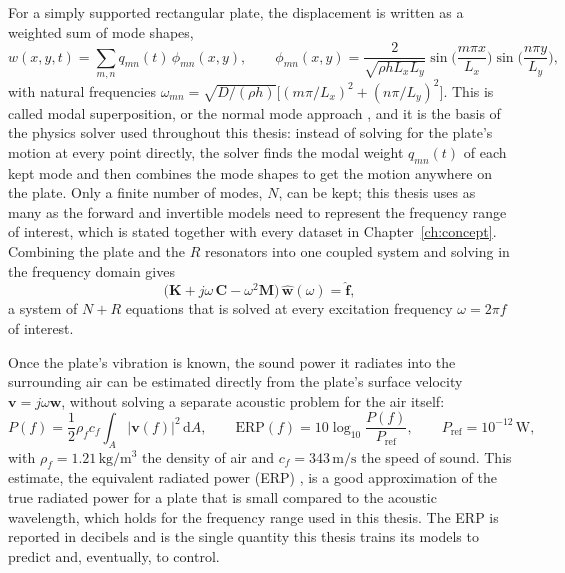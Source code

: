 For a simply supported rectangular plate, the displacement is written as a weighted sum of mode shapes,
\begin{equation}
w(x,y,t) = \sum_{m,n} q_{mn}(t)\,\phi_{mn}(x,y), \qquad \phi_{mn}(x,y) = \frac{2}{\sqrt{\rho h L_x L_y}}\sin\!\Big(\frac{m\pi x}{L_x}\Big)\sin\!\Big(\frac{n\pi y}{L_y}\Big),
\end{equation}
with natural frequencies $\omega_{mn} = \sqrt{D/(\rho h)}\big[(m\pi/L_x)^2 + (n\pi/L_y)^2\big]$. This is called modal superposition, or the normal mode approach \parencite{gavric1993sti}, and it is the basis of the physics solver used throughout this thesis: instead of solving for the plate's motion at every point directly, the solver finds the modal weight $q_{mn}(t)$ of each kept mode and then combines the mode shapes to get the motion anywhere on the plate. Only a finite number of modes, $N$, can be kept; this thesis uses as many as the forward and invertible models need to represent the frequency range of interest, which is stated together with every dataset in Chapter~\ref{ch:concept}. Combining the plate and the $R$ resonators into one coupled system and solving in the frequency domain gives
\begin{equation}
\big(\mathbf K + j\omega\,\mathbf C - \omega^2 \mathbf M\big)\, \hat{\mathbf w}(\omega) = \hat{\mathbf f},
\end{equation}
a system of $N+R$ equations that is solved at every excitation frequency $\omega = 2\pi f$ of interest.

Once the plate's vibration is known, the sound power it radiates into the surrounding air can be estimated directly from the plate's surface velocity $\mathbf v = j\omega\mathbf w$, without solving a separate acoustic problem for the air itself:
\begin{equation}
P(f) = \frac{1}{2}\rho_f c_f \int_A |\mathbf v(f)|^2 \, \mathrm dA, \qquad \mathrm{ERP}(f) = 10 \log_{10}\frac{P(f)}{P_\text{ref}}, \qquad P_\text{ref} = 10^{-12}\,\si{\watt},
\end{equation}
with $\rho_f = 1.21\,\si{\kilo\gram\per\cubic\meter}$ the density of air and $c_f = 343\,\si{\meter\per\second}$ the speed of sound. This estimate, the equivalent radiated power (ERP) \parencite{luegmair2015advanced}, is a good approximation of the true radiated power for a plate that is small compared to the acoustic wavelength, which holds for the frequency range used in this thesis. The ERP is reported in decibels and is the single quantity this thesis trains its models to predict and, eventually, to control.

